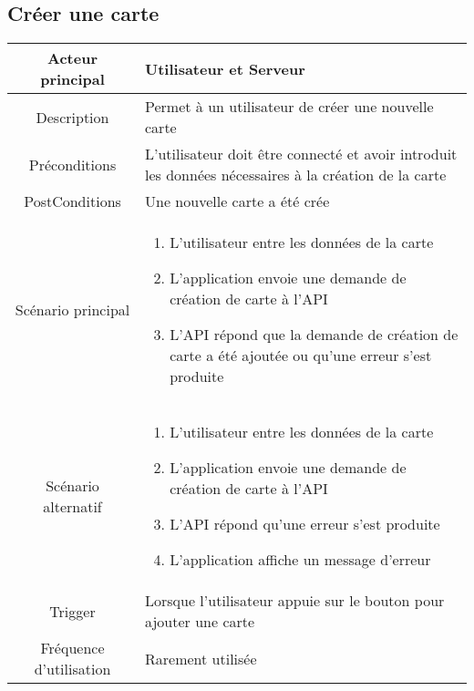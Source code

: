 \documentclass{article}
\begin{document}
    \newpage

\subsection{Créer une carte}
    \begin{table}[h]
        \begin{tabular}{|c|p{10cm}|}
        \hline
        Acteur principal& Utilisateur et Serveur \\
        \hline
        Description& Permet à un utilisateur de créer une nouvelle carte \\
        \hline
        Préconditions& L'utilisateur doit être connecté et avoir introduit les données nécessaires
            à la création de la carte \\
        \hline
        PostConditions&  Une nouvelle carte a été crée\\
        \hline
        Scénario principal& 
                \begin{enumerate}
                    \item L'utilisateur entre les données de la carte
                    \item L'application envoie une demande de création de carte à l'API
                    \item L'API répond que la demande de création de carte a été ajoutée ou qu'une erreur s'est produite
                \end{enumerate}     \\
        \hline
        Scénario alternatif& 
            \begin{enumerate}
                \item L'utilisateur entre les données de la carte
                \item L'application envoie une demande de création de carte à l'API
                \item L'API répond qu'une erreur s'est produite
                \item L'application affiche un message d'erreur
            \end{enumerate}     \\
        \hline
        Trigger&  Lorsque l'utilisateur appuie sur le bouton pour ajouter une carte   \\
        \hline
        Fréquence d'utilisation& Rarement utilisée  \\
        \hline
        \end{tabular}
    \end{table}
\end{document}
